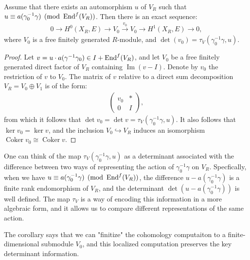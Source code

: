 \documentclass[12pt]{article}
\begin{document}
\begin{corollary}
    Assume that there exists an automorphism $u$ of $V_R$ such that $u \equiv a(\gamma_0^{-1}\gamma) \pmod{\operatorname{End}^f(V_R)}$. Then there is an exact sequence:
    \begin{align*}
        0 \to H^0(X_R, E) \to V_0 \xrightarrow{v_0} V_0 \to H^1(X_R, E) \to 0,
    \end{align*}
    where $V_0$ is a free finitely generated $R$-module, and $\det(v_0) = \tau_V(\gamma_0^{-1}\gamma, u)$.
\end{corollary}

\begin{proof}
    Let $v = u \cdot a(\gamma^{-1}\gamma_0) \in I + \operatorname{End}^f(V_R)$, and let $V_0$ be a free finitely generated direct factor of $V_R$ containing $\operatorname{Im}(v - I)$. Denote by $v_0$ the restriction of $v$ to $V_0$. The matrix of $v$ relative to a direct sum decomposition $V_R = V_0 \oplus V_1$ is of the form:
    \begin{align*}
        \begin{pmatrix}
            v_0 & * \\
            0   & I
        \end{pmatrix},
    \end{align*}
    from which it follows that $\det v_0 = \det v = \tau_V(\gamma_0^{-1}\gamma, u)$. It also follows that $\ker v_0 = \ker v$, and the inclusion $V_0 \hookrightarrow V_R$ induces an isomorphism $\operatorname{Coker} v_0 \cong \operatorname{Coker} v$.
\end{proof}

\begin{remark}
    One can think of the map $\tau_V(\gamma_0^{-1}\gamma,u)$ as a determinant associated with the difference between two ways of representing the action of $\gamma_0^{-1}\gamma$ on $V_R$. Specfically, when we have $u \equiv a(\gamma_0^{-1}\gamma) \pmod{\operatorname{End}^f(V_R)}$, the difference $u - a(\gamma_0^{-1}\gamma)$ is a finite rank endomorphism of $V_R$, and the determinant $\det(u - a(\gamma_0^{-1}\gamma))$ is well defined. The map $\tau_V$ is a way of encoding this information in a more algebraic form, and it allows us to compare different representations of the same action.

    The corollary says that we can "finitize" the cohomology computaiton to a finite-dimensional submodule $V_0$, and this localized computation preserves the key determinant information.
\end{remark}
\end{document}
